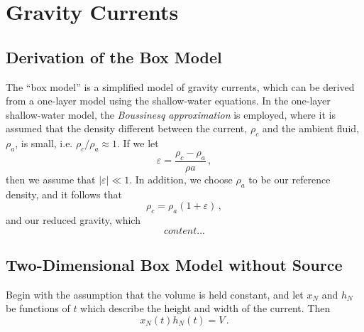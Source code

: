 


	\tableofcontents
	
	\chapter{Gravity Currents}
	
	\section{Derivation of the Box Model}
	
	The ``box model'' is a simplified model of gravity currents, which can be derived from a one-layer model using the shallow-water equations. In the one-layer shallow-water model, the \textit{Boussinesq approximation} is employed, where it is assumed that the density different between the current, \(\rho_c\) and the ambient fluid, \(\rho_a\), is small, i.e. \(\rho_c/\rho_a \approx 1\). If we let
	\begin{equation*}
		\varepsilon = \frac{\rho_c - \rho_a}{\rho a}\,,
	\end{equation*}
	then we assume that \(|\varepsilon| \ll 1\). In addition, we choose \(\rho_a\) to be our reference density, and it follows that
	\begin{equation*}
		\rho_c = \rho_a(1 + \varepsilon)\,,
	\end{equation*}
	and our reduced gravity, which 
	\begin{equation*}
		content...
	\end{equation*}
	
	\section{Two-Dimensional Box Model without Source}
	
	Begin with the assumption that the volume is held constant, and let \(x_N\) and \(h_N\) be functions of \(t\) which describe the height and width of the current. Then
	\begin{equation*}
		x_N(t)h_N(t) = V \,.
	\end{equation*}

	
